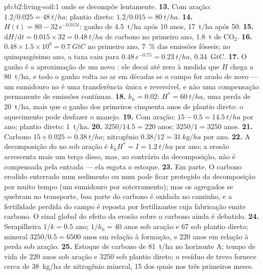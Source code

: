 \begin{solution}{pb:b2:living-soil:1}
onde se decompõe lentamente.
\textbf{13.} Com aração: $1.2/0.025 = \qty{48}{t/ha}$; plantio direto:
$1.2/0.015 = \qty{80}{t/ha}$.
\textbf{14.} $H(t) = 80 - 32\,e^{-0.015t}$: ganho de \qty{4.5}{t/ha}
após 10 anos, \qty{17}{t/ha} após 50.
\textbf{15.} $\mathrm{d}H/\mathrm{d}t = 0.015\times 32 =
\qty{0.48}{t/ha}$ de carbono no primeiro ano, \qty{1.8}{t} de
$\mathrm{CO_2}$.
\textbf{16.} $0.48\times 1.5\times 10^{9} = \qty{0.7}{GtC}$ no
primeiro ano, \qty{7}{\%} das emissões fósseis; no quinquagésimo ano, a
taxa caiu para $0.48\,e^{-0.75} = \qty{0.23}{t/ha}$,
\qty{0.34}{GtC}.
\textbf{17.} O ganho é a aproximação de um novo : ele
decai até zero à medida que $H$ chega a \qty{80}{t/ha}, e todo o ganho
volta ao ar em décadas se o campo for arado de novo --- um sumidouro no
 é uma transferência única e reversível, e não uma compensação
permanente de emissões contínuas.
\textbf{18.} $k_h = 0.02$: $H^{*} = \qty{60}{t/ha}$, uma perda de
\qty{20}{t/ha}, mais que o ganho dos primeiros cinquenta anos de plantio direto: o aquecimento pode
desfazer o manejo.
\textbf{19.} Com aração: $15 - 0.5 = \qty{14.5}{t/ha}$ por ano; plantio
direto: \qty{1}{t/ha}.
\textbf{20.} $3250/14.5 = 220$ anos; $3250/1 = 3250$ anos.
\textbf{21.} Carbono $15\times 0.025 = \qty{0.38}{t/ha}$; nitrogênio
$0.38/12 = \qty{31}{kg/ha}$ por ano.
\textbf{22.} A decomposição do  no  sob aração é
$k_hH^{*} =
I = \qty{1.2}{t/ha}$ por ano; a erosão acrescenta mais um terço disso,
mas, ao contrário da decomposição, não é compensada pela entrada ---
ela esgota o estoque.
\textbf{23.} Em parte. O carbono erodido enterrado num sedimento ou num
 pode ficar protegido da decomposição por muito tempo (um
sumidouro por soterramento); mas os agregados se quebram no transporte,
boa parte do carbono é oxidada no caminho, e a fertilidade perdida do
campo é reposta por fertilizantes cuja fabricação emite carbono. O sinal
global do efeito da erosão sobre o carbono ainda é debatido.
\textbf{24.} Serapilheira $1/k = 0.5$ ano;  $1/k_h = 40$ anos
sob aração e 67 sob plantio direto;  mineral $3250/0.5 =
6500$ anos em relação à formação, e 220 anos em relação à perda sob
aração.
\textbf{25.} Estoque de carbono de \qty{81}{t/ha} no horizonte A; tempo
de vida de 220 anos sob aração e 3250 sob plantio direto; o resíduo de
trevo fornece cerca de \qty{38}{kg/ha} de nitrogênio mineral, 15 dos
quais nos três primeiros meses.
\end{solution}
